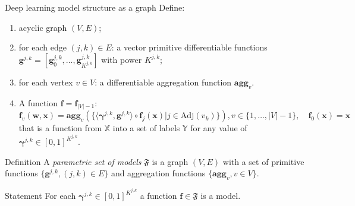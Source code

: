 \documentclass[usenames,dvipsnames,11pt,pdf,utf8,russian,aspectratio=43]{beamer}
\begin{document}
\begin{frame}{Deep learning model structure as a graph}
\footnotesize
Define:
\begin{enumerate}
 \item acyclic graph $(V,E)$;
\item for each edge $(j,k) \in E$: a vector primitive differentiable functions $\mathbf{g}^{j,k} = [\mathbf{g}^{j,k}_0, \dots, \mathbf{g}^{j,k}_{K^{j,k}}]$  with power $K^{j,k}$;
\item for each vertex $v \in V$: a differentiable aggregation function  $\textbf{agg}_v$.
\item A function $\mathbf{f} = \mathbf{f}_{|V|-1}:$
\begin{equation}
\label{eq:modelfam}
    \mathbf{f}_{v}(\mathbf{w}, \mathbf{x}) = \textbf{agg}_{v}\left(\{ \langle \boldsymbol{\gamma}^{j,k}, \mathbf{g}^{j,k} \rangle \circ  \mathbf{f}_j(\mathbf{x})| j \in \text{Adj}(v_k)\}\right), v \in \{1,\dots,|V|-1\}, \quad \mathbf{f}_0(\mathbf{x}) = \mathbf{x}
\end{equation}
that is a function from  $\mathbb{X}$ into a set of labels $\mathbb{Y}$ for any value of  $\boldsymbol{\gamma}^{j,k} \in [0,1]^{K^{j,k}}$.
\end{enumerate}

\begin{block}{Definition}
A \textit{parametric set of models} $\mathfrak{F}$ is a graph $(V, E)$  with a set of primitive functions $\{\mathbf{g}^{j,k}, (j,k) \in E\}$ and aggregation functions  $\{ \textbf{agg}_v, {v \in V}\}$.
\end{block}
\begin{block}{Statement}
For each  $\boldsymbol{\gamma}^{j,k} \in [0,1]^{K^{j,k}}$ a function $\mathbf{f} \in \mathfrak{F}$ is a model.
\end{block}
\end{frame}

      
\end{document}
